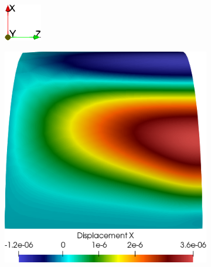 \begin{figure}[h!]
    \centering
    \caption{Campos de deslocamentos obtido na simulação de cilindro.}
    \begin{subfigure}{0.075\textwidth}
        \includegraphics[width=\linewidth]{Figuras/cylinder-shell/eixos.png}
    \end{subfigure}
    \begin{subfigure}{0.3\textwidth}
        \includegraphics[width=\linewidth]{Figuras/cylinder-shell/ux.png}

\end{subfigure}
\end{figure}
